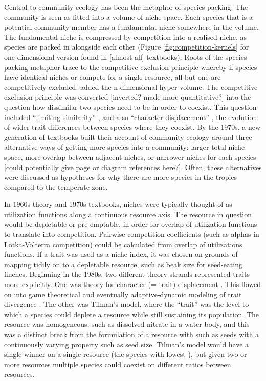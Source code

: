 \documentclass[a4paper,11pt]{article}
\begin{document}
Central to community ecology has been the metaphor of species packing. The community is seen as fitted into a volume of niche space. Each species that is a potential community member has a fundamental niche somewhere in the volume. The fundamental niche is compressed by competition into a realised niche, as species are packed in alongside each other (Figure \ref{fig:competition-kernels} for one-dimensional version found in [almost all] textbooks). Roots of the species packing metaphor trace to the competitive exclusion principle \cite{Lotka-1925, Volterra-1926, Gause-1934} whereby if species have identical niches or compete for a single resource, all but one are competitively excluded. \citet{Hutchinson-1957} added the n-dimensional hyper-volume. The  competitive exclusion principle was converted [inverted? made more quantitative?] into the question how dissimilar two species need to be in order to coexist. This question included ``limiting similarity'' \citep{MacArthur-1967}, and also ``character displacement'' \citep{Brown-1956}, the evolution of wider trait differences between species where they coexist. By the 1970s, a new generation of textbooks \citep{Whittaker-1970,Krebs-1972,Ricklefs-1973,pianka-1974} built their account of community ecology around three alternative ways of getting more species into a community: larger total niche space, more overlap between adjacent niches, or narrower niches for each species [could potentially give page or diagram references here?]. Often, these alternatives were discussed as hypotheses for why there are more species in the tropics compared to the temperate zone.


In 1960s theory and 1970s textbooks, niches were typically thought of as utilization functions along a continuous resource axis. The resource in question would be depletable or pre-emptable, in order for overlap of utilization functions to translate into competition. Pairwise competition coefficients (such as alphas in Lotka-Volterra competition) could be calculated from overlap of utilizations functions. If a trait was used as a niche index, it was chosen on grounds of mapping tidily on to a depletable resource, such as beak size for seed-eating finches. Beginning in the 1980s, two different theory strands represented traits more explicitly. One was theory for character (= trait) displacement \citep[e.g.,][]{Taper-1985, Case-2000, Goldberg-2006}. This flowed on into game theoretical and eventually adaptive-dynamic modeling of trait divergence \citep{Brown-1987,Geritz-1998,Geritz-1999,Dieckmann-1999,Abrams-2001}. The other was Tilman's \citeyear{Tilman-1982} \Rstar model, where the ``trait'' was the level to which a species could deplete a resource while still sustaining its population. The resource was homogeneous, such as dissolved nitrate in a water body, and this was a distinct break from the formulation of a resource with such as seeds with a continuously varying property such as seed size. Tilman's \citeyear{Tilman-1982} model would have a single winner on a single resource (the species with lowest \Rstar), but given two or more resources multiple species could coexist on different ratios between resources.
\end{document}
